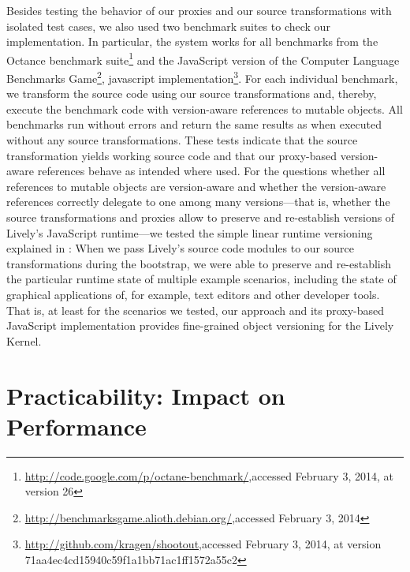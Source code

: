 Besides testing the behavior of our proxies and our source transformations with isolated test cases, we also used two benchmark suites to check our implementation.
In particular, the system works for all benchmarks from the Octance benchmark suite\footnote{\url{http://code.google.com/p/octane-benchmark/},\goodbreak accessed February 3, 2014, at version 26} and the JavaScript version of the Computer Language Benchmarks Game\footnote{\url{http://benchmarksgame.alioth.debian.org/},\goodbreak accessed February 3, 2014}, javascript implementation\footnote{\url{http://github.com/kragen/shootout},\goodbreak accessed February 3, 2014, at version 71aa4ec4cd15940c59f1a1bb71ac1ff1572a55c2}.
For each individual benchmark, we transform the source code using our source transformations and, thereby, execute the benchmark code with version-aware references to mutable objects.
All benchmarks run without errors and return the same results as when executed without any source transformations.
These tests indicate that the source transformation yields working source code and that our proxy-based version-aware references behave as intended where used.
For the questions whether all references to mutable objects are version-aware and whether the version-aware references correctly delegate to one among many versions---that is, whether the source transformations and proxies allow to preserve and re-establish versions of Lively's JavaScript runtime---we tested the simple linear runtime versioning explained in :
When we pass Lively's source code modules to our source transformations during the bootstrap, we were able to preserve and re-establish the particular runtime state of multiple example scenarios, including the state of graphical applications of, for example, text editors and other developer tools.
That is, at least for the scenarios we tested, our approach and its proxy-based JavaScript implementation provides fine-grained object versioning for the Lively Kernel.




\section{Practicability: Impact on Performance}

